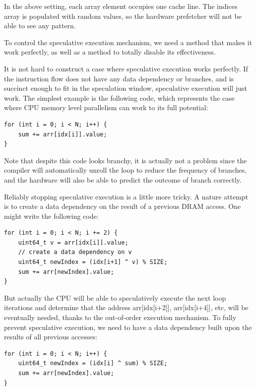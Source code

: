 \documentclass[11pt, usletter]{article}
\begin{document}
In the above setting, each array element occupies one cache line. 
The indices array is populated with random values, 
so the hardware prefetcher will not be able to see any pattern.

To control the speculative execution mechanism, we need a method that makes it work perfectly, 
as well as a method to totally disable its effectiveness.

It is not hard to construct a case where speculative execution works perfectly. 
If the instruction flow does not have any data dependency or branches, 
and is succinct enough to fit in the speculation window, speculative execution will just work. 
The simplest example is the following code, 
which represents the case where CPU memory level parallelism can work to its full potential:

\singlespacing\begin{codebox}
\begin{verbatim}
for (int i = 0; i < N; i++) {
    sum += arr[idx[i]].value;
}
\end{verbatim}
\end{codebox}\doublespacing

Note that despite this code looks branchy, 
it is actually not a problem since the compiler will automatically unroll the loop 
to reduce the frequency of branches, and the hardware will also be able to predict the outcome of branch correctly. 

Reliably stopping speculative execution is a little more tricky. 
A nature attempt is to create a data dependency on the result of a previous DRAM access. One might write the following code:

\singlespacing\begin{codebox}
\begin{verbatim}
for (int i = 0; i < N; i += 2) {
    uint64_t v = arr[idx[i]].value;
    // create a data dependency on v
    uint64_t newIndex = (idx[i+1] ^ v) % SIZE;
    sum += arr[newIndex].value;	
}
\end{verbatim}
\end{codebox}\doublespacing

But actually the CPU will be able to speculatively execute the next loop iterations 
and determine that the address arr[idx[i+2]], arr[idx[i+4]], etc, will be eventually needed,
thanks to the out-of-order execution mechanism. 
To fully prevent speculative execution, we need to have a data dependency built upon the results of all previous accesses:

\singlespacing\begin{codebox}
\begin{verbatim}
for (int i = 0; i < N; i++) {
    uint64_t newIndex = (idx[i] ^ sum) % SIZE;
    sum += arr[newIndex].value;	
}
\end{verbatim}
\end{codebox}\doublespacing
\end{document}
